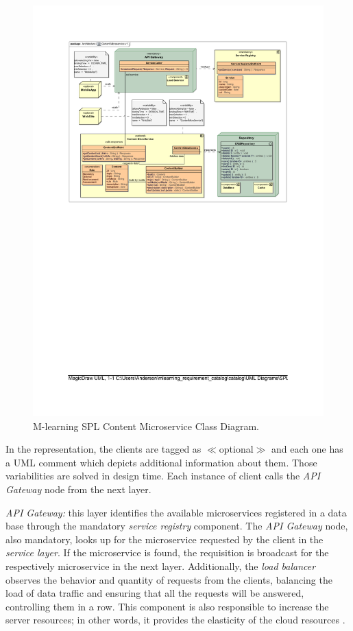 \begin{figure}[!h]
    \centering
    \includegraphics[scale=1.00]{content.pdf}
    \caption{M-learning SPL Content Microservice Class Diagram.}
    \label{fig:class}
\end{figure}



In the representation, the clients are tagged as $\ll$optional$\gg$ and each one has a UML comment which depicts additional information about them. Those variabilities are solved in design time. Each instance of client calls the \textit{API Gateway} node from the next layer.





\textit{API Gateway:} this layer identifies the available microservices registered in a data base through the mandatory \textit{service registry} component. The \textit{API Gateway} node, also mandatory, looks up for the microservice requested by the client in the \textit{service layer}. If the microservice is found, the requisition is broadcast for the respectively microservice in the next layer. Additionally, the \textit{load balancer} observes the behavior and quantity of requests from the clients, balancing the load of data traffic and ensuring that all the requests will be answered, controlling them in a row. This component is also responsible to increase the server resources; in other words, it provides the elasticity of the cloud resources \cite{Pressman:2015, Newman:2015:BM:2904388}.




